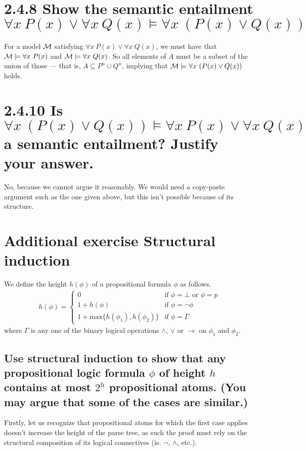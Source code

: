 \documentclass[11pt,a4paper]{article}
\let\imp\to
\begin{document}
\section*{2.4.8 \mdseries Show the semantic entailment $\forall x{\ }P (x)
\lor \forall x{\ }Q(x) \models \forall x{\ }(P (x) \lor Q(x))$}
For a model $\cal M$ satisfying $\forall x{\ }P (x) \lor \forall x{\ }Q(x)$,
we must have that ${\cal M} \models \forall x{\ }P (x)$ and ${\cal M} \models
\forall x{\ }Q(x)$. So all elements of $A$ must be a subset of the union of
those --- that is, $A \subseteq P^n \cup Q^n$, implying that ${\cal M} \models
\forall x{\ }(P(x) \lor Q(x))$ holds.

\section*{2.4.10 \mdseries Is $\forall x{\ }(P (x) \lor Q(x)) \models \forall
x{\ }P(x) \lor \forall x{\ }Q(x)$ a semantic entailment? Justify your answer.}
No, because we cannot argue it reasonably. We would need a copy-paste argument
such as the one given above, but this isn't possible because of its structure.

\newpage
\section*{Additional exercise \mdseries Structural induction}
We define the height $h(\phi)$ of a propositional formula $\phi$ as follows.
\begin{align*}
	h(\phi) =
	\begin{cases}
		0
		& \mbox{if $\phi = \bot$ or $\phi = p$} \\
		1 + h(\phi)
		& \mbox{if $\phi = \neg \phi$} \\
		1 + \text{max}\{h(\phi_1), h(\phi_2)\}
		& \mbox{if $\phi = \Gamma$}
	\end{cases}
\end{align*}
where $\Gamma$ is any one of the binary logical operations $\land$, $\lor$ or
$\imp$ on $\phi_1$ and $\phi_2$.

\subsection*{Use structural induction to show that any propositional logic
formula $\phi$ of height $h$ contains at most $2^h$ propositional atoms. (You
may argue that some of the cases are similar.)}
Firstly, let us recognize that propositional atoms for which the first case
applies doesn't increase the height of the parse tree, as such the proof must
rely on the structural composition of its logical connectives (ie. $\neg$,
$\land$, etc.).
\end{document}
